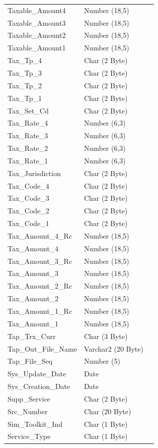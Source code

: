 \documentclass[12pt,twoside]{article}
\begin{document}
\begin{longtable}{l|l|l}
Taxable\_Amount4 & Number (18,5) & \\
Taxable\_Amount3 & Number (18,5) & \\
Taxable\_Amount2 & Number (18,5) & \\
Taxable\_Amount1 & Number (18,5) & \\
Tax\_Tp\_4 & Char (2 Byte) & \\
Tax\_Tp\_3 & Char (2 Byte) & \\
Tax\_Tp\_2 & Char (2 Byte) & \\
Tax\_Tp\_1 & Char (2 Byte) & \\
Tax\_Set\_Cd & Char (2 Byte) & \\
Tax\_Rate\_4 & Number (6,3) & \\
Tax\_Rate\_3 & Number (6,3) & \\
Tax\_Rate\_2 & Number (6,3) & \\
Tax\_Rate\_1 & Number (6,3) & \\
Tax\_Jurisdiction & Char (2 Byte) & \\
Tax\_Code\_4 & Char (2 Byte) & \\
Tax\_Code\_3 & Char (2 Byte) & \\
Tax\_Code\_2 & Char (2 Byte) & \\
Tax\_Code\_1 & Char (2 Byte) & \\
Tax\_Amount\_4\_Rc & Number (18,5) & \\
Tax\_Amount\_4 & Number (18,5) & \\
Tax\_Amount\_3\_Rc & Number (18,5) & \\
Tax\_Amount\_3 & Number (18,5) & \\
Tax\_Amount\_2\_Rc & Number (18,5) & \\
Tax\_Amount\_2 & Number (18,5) & \\
Tax\_Amount\_1\_Rc & Number (18,5) & \\
Tax\_Amount\_1 & Number (18,5) & \\
Tap\_Trx\_Curr & Char (3 Byte) & \\
Tap\_Out\_File\_Name & Varchar2 (20 Byte) & \\
Tap\_File\_Seq & Number (5) & \\
Sys\_Update\_Date & Date & \\
Sys\_Creation\_Date & Date & \\
Supp\_Service & Char (2 Byte) & \\
Src\_Number & Char (20 Byte) & \\
Sim\_Toolkit\_Ind & Char (1 Byte) & \\
Service\_Type & Char (1 Byte) & \\

\end{longtable}
\end{document}
